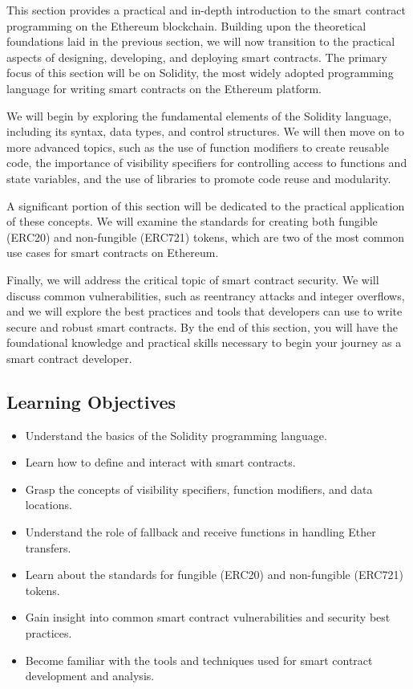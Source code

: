 This section provides a practical and in-depth introduction to the smart contract programming on the Ethereum blockchain.
Building upon the theoretical foundations laid in the previous section,
we will now transition to the practical aspects of designing,
developing, and deploying smart contracts. The primary focus of this
section will be on Solidity, the most widely adopted programming
language for writing smart contracts on the Ethereum platform.

We will begin by exploring the fundamental elements of the Solidity
language, including its syntax, data types, and control structures. We
will then move on to more advanced topics, such as the use of function
modifiers to create reusable code, the importance of visibility
specifiers for controlling access to functions and state variables, and
the use of libraries to promote code reuse and modularity.

A significant portion of this section will be dedicated to the practical
application of these concepts. We will examine the standards for
creating both fungible (ERC20) and non-fungible (ERC721) tokens, which
are two of the most common use cases for smart contracts on Ethereum.

Finally, we will address the critical topic of smart contract security.
We will discuss common vulnerabilities, such as reentrancy attacks and
integer overflows, and we will explore the best practices and tools that
developers can use to write secure and robust smart contracts. By the
end of this section, you will have the foundational knowledge and
practical skills necessary to begin your journey as a smart contract
developer.

\subsection{Learning Objectives}\label{learning-objectives}

\begin{itemize}
	\tightlist
	\item
	Understand the basics of the Solidity programming language.
	\item
	Learn how to define and interact with smart contracts.
	\item
	Grasp the concepts of visibility specifiers, function modifiers, and
	data locations.
	\item
	Understand the role of fallback and receive functions in handling
	Ether transfers.
	\item
	Learn about the standards for fungible (ERC20) and non-fungible
	(ERC721) tokens.
	\item
	Gain insight into common smart contract vulnerabilities and security
	best practices.
	\item
	Become familiar with the tools and techniques used for smart contract
	development and analysis.
\end{itemize}

